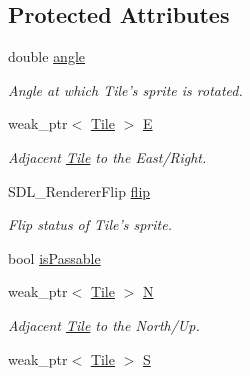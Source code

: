\subsection*{Protected Attributes}
\begin{DoxyCompactItemize}
\item 
double \hyperlink{class_tile_a33219999fbd38d9c9e8e98d09a9b65a5}{angle}\hypertarget{class_tile_a33219999fbd38d9c9e8e98d09a9b65a5}{}\label{class_tile_a33219999fbd38d9c9e8e98d09a9b65a5}

\begin{DoxyCompactList}\small\item\em Angle at which Tile’s sprite is rotated. \end{DoxyCompactList}\item 
weak\+\_\+ptr$<$ \hyperlink{class_tile}{Tile} $>$ \hyperlink{class_tile_af8130191ee5d094e7505fd26f676393c}{E}\hypertarget{class_tile_af8130191ee5d094e7505fd26f676393c}{}\label{class_tile_af8130191ee5d094e7505fd26f676393c}

\begin{DoxyCompactList}\small\item\em Adjacent \hyperlink{class_tile}{Tile} to the East/\+Right. \end{DoxyCompactList}\item 
S\+D\+L\+\_\+\+Renderer\+Flip \hyperlink{class_tile_a815af374aa83cd0be79bb5553056b15e}{flip}\hypertarget{class_tile_a815af374aa83cd0be79bb5553056b15e}{}\label{class_tile_a815af374aa83cd0be79bb5553056b15e}

\begin{DoxyCompactList}\small\item\em Flip status of Tile’s sprite. \end{DoxyCompactList}\item 
bool \hyperlink{class_tile_afa72b458d549b9533f058e2d2fad0f81}{is\+Passable}
\item 
weak\+\_\+ptr$<$ \hyperlink{class_tile}{Tile} $>$ \hyperlink{class_tile_a4c0be3e9600a9694e7e91d54090b37d4}{N}\hypertarget{class_tile_a4c0be3e9600a9694e7e91d54090b37d4}{}\label{class_tile_a4c0be3e9600a9694e7e91d54090b37d4}

\begin{DoxyCompactList}\small\item\em Adjacent \hyperlink{class_tile}{Tile} to the North/\+Up. \end{DoxyCompactList}\item 
weak\+\_\+ptr$<$ \hyperlink{class_tile}{Tile} $>$ \hyperlink{class_tile_abf033f1e7b26d12afacad32dd5f44ea5}{S}\hypertarget{class_tile_abf033f1e7b26d12afacad32dd5f44ea5}{}\label{class_tile_abf033f1e7b26d12afacad32dd5f44ea5}


\end{DoxyCompactItemize}
